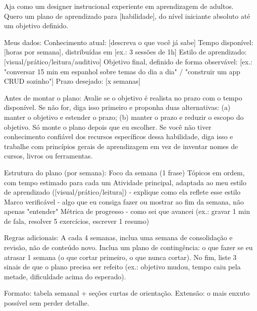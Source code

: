 \documentclass[11pt, a4paper]{article}
\begin{document}
\begin{promptbox}
Aja como um designer instrucional experiente em aprendizagem de adultos. 
Quero um plano de aprendizado para [habilidade], do nível iniciante absoluto até um objetivo definido.

Meus dados:
  Conhecimento atual: [descreva o que você já sabe]
  Tempo disponível: [horas por semana], distribuídas em [ex.: 3 sessões de 1h]
  Estilo de aprendizado: [visual/prático/leitura/auditivo]
  Objetivo final, definido de forma observável: [ex.: "conversar 15 min em espanhol sobre temas do dia a dia" / "construir um app CRUD sozinho"]
  Prazo desejado: [x semanas]

Antes de montar o plano:
  Avalie se o objetivo é realista no prazo com o tempo disponível. Se não for, diga isso primeiro e proponha duas alternativas: (a) manter o objetivo e estender o prazo; (b) manter o prazo e reduzir o escopo do objetivo. Só monte o plano depois que eu escolher.
  Se você não tiver conhecimento confiável dos recursos específicos dessa habilidade, diga isso e trabalhe com princípios gerais de aprendizagem em vez de inventar nomes de cursos, livros ou ferramentas.

Estrutura do plano (por semana):
  Foco da semana (1 frase)
  Tópicos em ordem, com tempo estimado para cada um
  Atividade principal, adaptada ao meu estilo de aprendizado ([visual/prático/leitura]) - explique como ela reflete esse estilo
  Marco verificável - algo que eu consiga fazer ou mostrar ao fim da semana, não apenas "entender"
  Métrica de progresso - como sei que avancei (ex.: gravar 1 min de fala, resolver 5 exercícios, escrever 1 resumo)

Regras adicionais:
 A cada 4 semanas, inclua uma semana de consolidação e revisão, não de conteúdo novo.
 Inclua um plano de contingência: o que fazer se eu atrasar 1 semana (o que cortar primeiro, o que nunca cortar).
 No fim, liste 3 sinais de que o plano precisa ser refeito (ex.: objetivo mudou, tempo caiu pela metade, dificuldade acima do esperado).

Formato: tabela semanal + seções curtas de orientação. Extensão: o mais enxuto possível sem perder detalhe.
\end{promptbox}
\end{document}
